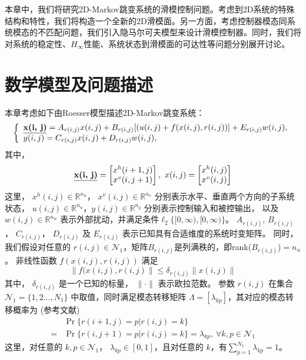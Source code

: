 	本章中，我们将研究2D-Markov跳变系统的滑模控制问题。考虑到2D系统的特殊结构和特性，我们将构造一个全新的2D滑模面。另一方面，考虑控制器模态同系统模态的不匹配问题，我们引入隐马尔可夫模型来设计滑模控制器。同时，我们将对系统的稳定性、$H_\infty$性能、系统状态到滑模面的可达性等问题分别展开讨论。

\section{数学模型及问题描述}
	本章考虑如下由Roesser模型描述2D-Markov跳变系统：
	\begin{equation} \label{system-equation}
	\left\{ 
	\begin{array}{lr}
	\begin{split}
	\emph{\textbf{x(i, j)}} = A_{r(i,j)}x(i,j)+B_{r(i,j)}[(u(i,j)+f(x(i,j),r(i,j))]+E_{r(i,j)}w(i,j),
	\end{split}\\
	\begin{split}
	y(i,j) = C_{r(i,j)}x(i,j)+D_{r(i,j)}w(i,j),
	\end{split}
	\end{array}
	\right.
	\end{equation}
	其中，
	\begin{equation*}
	\emph{\textbf{x(i, j)}} = \begin{bmatrix}
	x^{h}(i+1,j)\\
	x^{v}(i,j+1)
	\end{bmatrix}, \ 
	x(i, j) = \begin{bmatrix}
	x^{h}(i,j)\\
	x^{v}(i,j)
	\end{bmatrix}          
	\end{equation*}
	这里，	$x^{h}(i,j)\in \mathbb{R}^{n_h}$， $x^{v}(i,j)\in \mathbb{R}^{n_v}$ 分别表示水平、垂直两个方向的子系统状态， $u(i,j) \in \mathbb{R}^{n_u}$，$y(i,j) \in \mathbb{R}^{n_y}$ 分别表示控制输入和被控输出， 以及 $w(i,j) \in \mathbb{R}^{n_w}$ 表示外部扰动，并满足条件$\ell_{2}\{[0,\infty),[0,\infty)\}$。 $A_{r(i,j)}$, $B_{r(i,j)}$， $C_{r(i,j)}$， $D_{r(i,j)}$ 及 $E_{r(i,j)}$ 表示已知具有合适维度的系统时变矩阵。 同时，我们假设对任意的 $r(i,j)\in\mathcal{N}_{1}$，矩阵$B_{r(i,j)}$是列满秩的，即rank($B_{r(i,j)}$)$=n_u$。 非线性函数 $f(x(i,j),r(i,j))$ 满足
	\begin{equation}\label{nonlinear-func}
	\|f(x(i,j),r(i,j)\| \leq \delta_{r(i,j)}\|x(i,j)\|
	\end{equation}
	其中， $\delta_{r(i,j)}$ 是一个已知的标量， $\|\cdot\|$ 表示欧拉范数。 参数 $r(i,j)$ 在集合 $\mathcal{N}_{1}=\{1,2...,N_{1} \}$ 中取值，同时满足模态转移矩阵 $\varLambda = [\lambda_{kp}]$，其对应的模态转移概率为  (参考文献\cite{wu2018hcontrol2d,wu2008hfiltering2d})
	\begin{equation}\label{tps_system}
	\begin{split}
	&\Pr\{r(i+1,j)=p|r(i,j)=k\}\\
	=&\Pr\{r(i,j+1)=p|r(i,j)=k\}=\lambda_{kp},\  \forall k,p \in \mathcal{N}_{1}
	\end{split}
	\end{equation}	
	这里，对任意的  $k, p\in\mathcal{N}_{1}$， $\lambda_{kp}\in[0,1]$，且对任意的 $k$，有$\sum_{p=1}^{N_1}\lambda_{kp}=1$。
	
